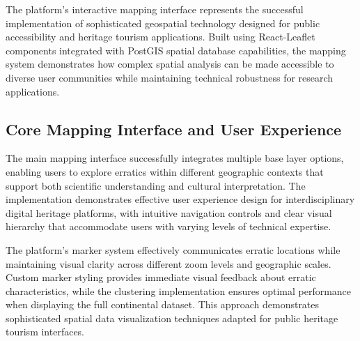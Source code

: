 The platform's interactive mapping interface represents the successful implementation of sophisticated geospatial technology designed for public accessibility and heritage tourism applications. Built using React-Leaflet components integrated with PostGIS spatial database capabilities, the mapping system demonstrates how complex spatial analysis can be made accessible to diverse user communities while maintaining technical robustness for research applications.

\subsection{Core Mapping Interface and User Experience}
\label{subsec:core_mapping_interface}

The main mapping interface successfully integrates multiple base layer options, enabling users to explore erratics within different geographic contexts that support both scientific understanding and cultural interpretation. The implementation demonstrates effective user experience design for interdisciplinary digital heritage platforms, with intuitive navigation controls and clear visual hierarchy that accommodate users with varying levels of technical expertise.


The platform's marker system effectively communicates erratic locations while maintaining visual clarity across different zoom levels and geographic scales. Custom marker styling provides immediate visual feedback about erratic characteristics, while the clustering implementation ensures optimal performance when displaying the full continental dataset. This approach demonstrates sophisticated spatial data visualization techniques adapted for public heritage tourism interfaces.


